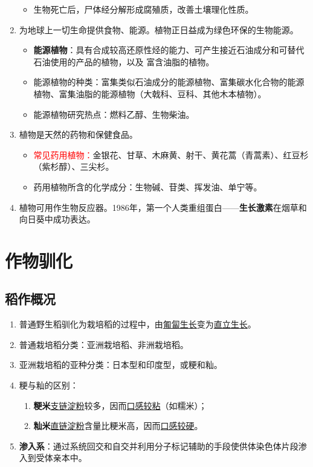 \begin{enumerate}
\begin{itemize}
        \item 生物死亡后，尸体经分解形成腐殖质，改善土壤理化性质。
    \end{itemize}
    \item 为地球上一切生命提供食物、能源。植物正日益成为绿色环保的生物能源。
    \begin{itemize}
        \item \textbf{能源植物}：具有合成较高还原性烃的能力、可产生接近石油成分和可替代石油使用的产品的植物，以及 富含油脂的植物。
        \item 能源植物的种类：富集类似石油成分的能源植物、富集碳水化合物的能源植物、富集油脂的能源植物（大戟科、豆科、其他木本植物）。
        \item 能源植物研究热点：燃料乙醇、生物柴油。
    \end{itemize}
    \item 植物是天然的药物和保健食品。
    \begin{itemize}
        \item \textcolor{red}{常见药用植物：}金银花、甘草、木麻黄、射干、黄花蒿（青蒿素）、红豆杉（紫杉醇）、三尖杉。
        \item 药用植物所含的化学成分：生物碱、苷类、挥发油、单宁等。
    \end{itemize}
    \item 植物可用作生物反应器。1986年，第一个人类重组蛋白——\textbf{生长激素}在烟草和向日葵中成功表达。
\end{enumerate}

\section{作物驯化}
\subsection{稻作概况}
\begin{enumerate}
    \item 普通野生稻驯化为栽培稻的过程中，由\uline{匍匐生长}变为\uline{直立生长}。
    \item 普通栽培稻分类：亚洲栽培稻、非洲栽培稻。
    \item 亚洲栽培稻的亚种分类：日本型和印度型，或粳和籼。
    \item 粳与籼的区别：
    \begin{enumerate}
        \item \textbf{粳米}\uline{支链淀粉}较多，因而\uline{口感较粘}（如糯米）；
        \item \textbf{籼米}\uline{直链淀粉}含量比粳米高，因而\uline{口感较硬}。
    \end{enumerate}
    \item \textbf{渗入系}：通过系统回交和自交并利用分子标记辅助的手段使供体染色体片段渗入到受体亲本中。
\end{enumerate}

